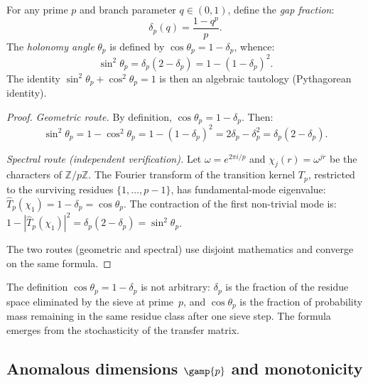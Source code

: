 \documentclass[12pt,a4paper]{article}
\begin{document}
\begin{theorembox}
For any prime $p$ and branch parameter $q \in (0,1)$, define the
\emph{gap fraction}:
\begin{equation}
  \delta_p(q) = \frac{1 - q^p}{p}.
  \tag{A.6}
\end{equation}
The \emph{holonomy angle} $\theta_p$ is defined by
$\cos\theta_p = 1 - \delta_p$, whence:
\begin{equation}
  \sin^2\!\theta_p = \delta_p(2 - \delta_p) = 1 - (1-\delta_p)^2.
  \tag{A.7}
\end{equation}
The identity $\sin^2\!\theta_p + \cos^2\!\theta_p = 1$ is then an
algebraic tautology (Pythagorean identity).

\begin{proof}
\emph{Geometric route.}
By definition, $\cos\theta_p = 1 - \delta_p$. Then:
\[
  \sin^2\!\theta_p = 1 - \cos^2\!\theta_p
  = 1 - (1-\delta_p)^2 = 2\delta_p - \delta_p^2 = \delta_p(2-\delta_p).
\]

\emph{Spectral route (independent verification).}
Let $\omega = e^{2\pi i/p}$ and $\chi_j(r) = \omega^{jr}$ be the
characters of $\mathbb{Z}/p\mathbb{Z}$. The Fourier transform of the
transition kernel $T_p$, restricted to the surviving residues
$\{1, \ldots, p-1\}$, has fundamental-mode eigenvalue:
$\widehat{T}_p(\chi_1) = 1 - \delta_p = \cos\theta_p$. The
contraction of the first non-trivial mode is:
$1 - |\widehat{T}_p(\chi_1)|^2 = \delta_p(2-\delta_p) = \sin^2\!\theta_p$.

The two routes (geometric and spectral) use disjoint mathematics and
converge on the same formula.
\end{proof}
\end{theorembox}

\begin{remark}
The definition $\cos\theta_p = 1 - \delta_p$ is not arbitrary:
$\delta_p$ is the fraction of the residue space eliminated by the sieve
at prime~$p$, and $\cos\theta_p$ is the fraction of probability mass
remaining in the same residue class after one sieve step. The formula
emerges from the stochasticity of the transfer matrix.
\end{remark}

\subsection{Anomalous dimensions $\gamp{p}$ and monotonicity}
\label{app:gamma}
\end{document}

